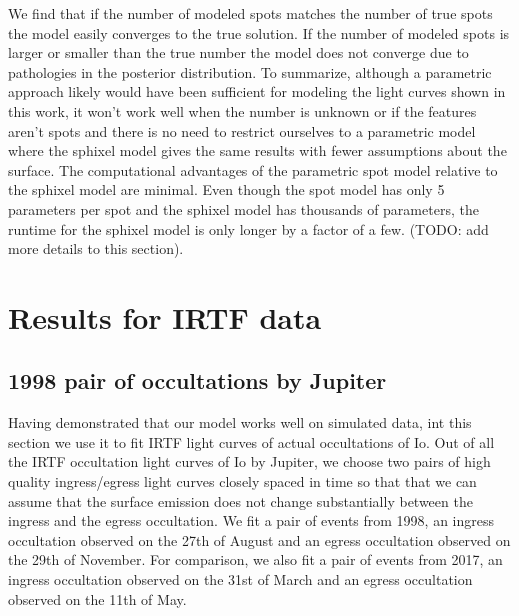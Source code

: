 \documentclass[modern]{aastex62}
\begin{document}
We find that if the number of modeled spots matches the number of true spots the model easily converges to the true solution. 
If the number of modeled spots is larger or smaller than the true number the model does not converge due to pathologies in the posterior distribution.
To summarize, although a parametric approach likely would have been sufficient for modeling the light curves shown in this work, it won't work well when the number is unknown or if the features aren't spots and there is no need to restrict ourselves to a parametric model where the sphixel model gives the same results with fewer assumptions about the surface. 
The computational advantages of the parametric spot model relative to the sphixel model are minimal. 
Even though the spot model has only 5 parameters per spot and the sphixel model has thousands of parameters, the runtime for the sphixel model is only longer by a factor of a few. (TODO: add more details to this section).

\section{Results for IRTF data}
\label{sec:results}
\subsection{1998 pair of occultations by Jupiter}
Having demonstrated that our model works well on simulated data, int this section we use it to fit IRTF light curves of actual occultations of Io.
Out of all the IRTF occultation light curves of Io by Jupiter, we choose two pairs of high quality ingress/egress light curves closely spaced in time so that that we can assume that the surface emission does not change substantially between the ingress and the egress occultation.
We fit a pair of events from 1998, an ingress occultation observed on the 27th of August and an egress occultation observed on the 29th of November.
For comparison, we also fit a pair of events from 2017, an ingress occultation observed on the 31st of March and an egress occultation observed on the 11th of May.
\end{document}
